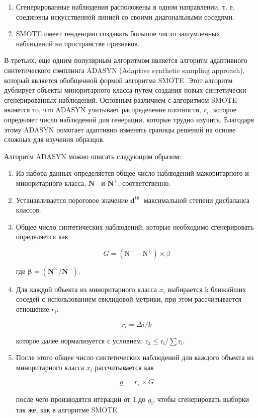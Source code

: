 \documentclass[12pt,a4paper, oneside]{extreport}
\begin{document}
\begin{enumerate}
	\item Сгенерированные наблюдения расположены в одном направлении, т. е. соединены искусственной линией со своими диагональными соседями.
	\item SMOTE имеет тенденцию создавать большое число  зашумленных наблюдений на  пространстве признаков.
\end{enumerate}


В-третьих, еще одним популярным алгоритмом является алгоритм 
адаптивного  синтетического сэмплинга ADASYN (Adaptive synthetic sampling approach), 
который является обобщенной формой алгоритма SMOTE. Этот алгоритм дублирует объекты миноритарного класса путем создания новых синтетически сгенерированных наблюдений. Основным различием с алгоритмом SMOTE  является то, что ADASYN учитывает распределение плотности, $r_i$, которое определяет число наблюдений для генерации, которые трудно изучить. Благодаря этому ADASYN помогает адаптивно изменять границы решений на основе сложных для изучения образцов. 

Алгоритм ADASYN можно описать следующим образом:

\begin{enumerate}
	\item Из набора данных определяется общее число наблюдений мажоритарного  и миноритарного класса, $\mathbf{N}^{-}$ и $\mathbf{N}^{+}$,  соответственно. 
	\item  Устанавливается  пороговое значение $\mathbf{d}^{\text {th }}$  максимальной степени дисбаланса классов. 
	\item  Общее число синтетических наблюдений, которые необходимо сгенерировать определяется как
	
	$$
	G=\left(\mathrm{N}^{-}-\mathrm{N}^{+}\right) \times \beta
	$$
	
	где  $\boldsymbol{\beta}=\left(\mathbf{N}^{+} / \mathbf{N}^{-}\right)$.
	
	\item  	Для каждой объекта  из миноритарного  класса  $x_i$ выбирается k ближайших соседей с использованием евклидовой метрики, при этом рассчитывается  отношение $r_i$:
	
	$$
	r_i  = \Delta i / k
	$$
	
	которое далее нормализуется с условием:  $\mathrm{r}_{\mathrm{x}}\leq\mathrm{r}_{\mathrm{i}} / \sum \mathrm{r}_{\mathrm{i}}$.
	
	\item  	После этого общее число синтетических наблюдений для каждого объекта из миноритарного  класса  $x_i$ рассчитывается как 
	
	$$
	g_{\mathrm{i}}=r_{\mathrm{x}} \times G
	$$
	
	после чего производятся итерации  от 1 до $g_{\mathrm{i}}$, чтобы сгенерировать выборки так же, как в  алгоритме SMOTE.
\end{enumerate}
\end{document}
